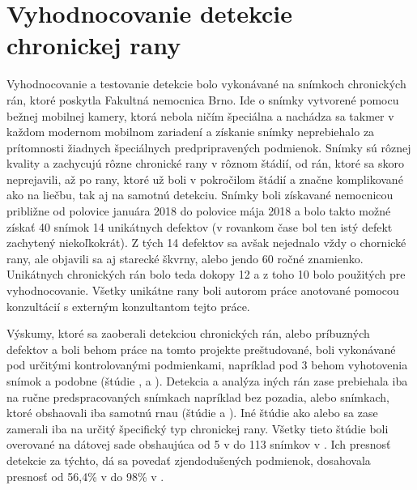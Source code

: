 \section{Vyhodnocovanie detekcie chronickej rany}
Vyhodnocovanie a testovanie detekcie bolo vykonávané na snímkoch chronických rán, ktoré poskytla Fakultná nemocnica Brno. Ide o snímky vytvorené pomocu bežnej mobilnej kamery, ktorá nebola ničím špeciálna a nachádza sa takmer v každom modernom mobilnom zariadení a získanie snímky neprebiehalo za prítomnosti žiadnych špeciálnych predpripravených podmienok. Snímky sú rôznej kvality a zachycujú rôzne chronické rany v rôznom štádií, od rán, ktoré sa skoro neprejavili, až po rany, ktoré už boli v pokročilom štádií a značne komplikované ako na liečbu, tak aj na samotnú detekciu. Snímky boli získavané nemocnicou približne od polovice januára 2018 do polovice mája 2018 a bolo takto možné získať 40 snímok 14 unikátnych defektov (v rovankom čase bol ten istý defekt zachytený niekoľkokrát). Z tých 14 defektov sa avšak nejednalo vždy o chornické rany, ale objavili sa aj starecké škvrny, alebo jendo 60 ročné znamienko. Unikátnych chronických rán bolo teda dokopy 12 a z toho 10 bolo použitých pre vyhodnocovanie. Všetky unikátne rany boli autorom práce anotované pomocou konzultácií s externým konzultantom tejto práce.

Výskumy, ktoré sa zaoberali detekciou chronických rán, alebo príbuzných defektov a boli behom práce na tomto projekte preštudované, boli vykonávané pod určitými kontrolovanými podmienkami, napríklad pod 3 behom vyhotovenia snímok a podobne (štúdie \cite{4353723}, \cite{6461344} a \cite{6399754}). Detekcia a analýza iných rán zase prebiehala iba na ručne predspracovaných snímkach napríklad bez pozadia, alebo snímkach, ktoré obshaovali iba samotnú rnau (štúdie \cite{5286322} a \cite{6306219}). Iné štúdie ako \cite{6172044} alebo \cite{6392633} sa zase zamerali iba na určitý špecifický typ chronickej rany. Všetky tieto štúdie boli overované na dátovej sade obshaujúca od 5 v \cite{6172044} do 113 snímkov v \cite{5286322}. Ich presnosť detekcie za týchto, dá sa povedať zjendodušených podmienok, dosahovala presnosť od 56,4\% v \cite{4353723} do 98\% v \cite{6306219}. 

